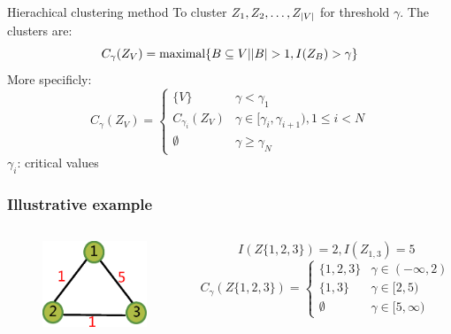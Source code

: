 \documentclass{beamer}
\DeclarePairedDelimiter\abs{\lvert}{\rvert}
\begin{document}
\begin{frame}{Hierachical clustering method}
To cluster $Z_1, Z_2, \dots, Z_{\abs{V}}$ for threshold $\gamma$.
The clusters are:
\begin{equation}
C_{\gamma}(Z_V) = \textrm{maximal}\{ B \subseteq V \vert \abs{B} > 1, I(Z_B) > \gamma \}
\end{equation}
More specificly:
\begin{equation*}
C_{\gamma}(Z_V) = \begin{cases}
\{V\} & \gamma < \gamma_1 \\
C_{\gamma_i}(Z_V) & \gamma \in [\gamma_i, \gamma_{i+1}), 1\leq i < N \\
\emptyset & \gamma \geq \gamma_N
\end{cases}
\end{equation*}
$\gamma_i$: \alert{critical values}
\end{frame}
\begin{frame}
\frametitle{Illustrative example}
\begin{columns}
\column{4cm}
\begin{figure}
\includegraphics[width=4cm]{pic/example.eps}
\end{figure}
\column{6cm}
\begin{equation*}
I(Z\{1,2,3\}) = 2, I(Z_{1,3}) = 5
\end{equation*}
\begin{equation*}
C_{\gamma}(Z\{1,2,3\}) = \begin{cases}
\{1,2,3\} & \gamma \in (-\infty, 2) \\
\{1, 3\} & \gamma \in [2, 5) \\
\emptyset & \gamma \in [5, \infty)
\end{cases}
\end{equation*}
\end{columns}
\end{frame}
\end{document}
